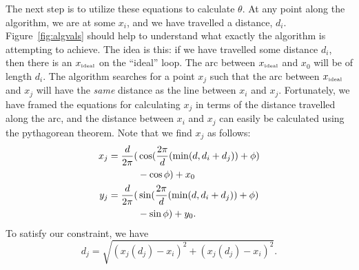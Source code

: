 \documentclass[twocolumn,11pt]{article}
\begin{document}
The next step is to utilize these equations to calculate $\theta$. At any point
along the algorithm, we are at some $x_i$, and we have travelled a distance,
$d_i$. Figure~\ref{fig:algvals} should help to understand what exactly the
algorithm is attempting to achieve. The idea is this: if we have travelled some
distance $d_i$, then there is an $x_{\mbox{{\tiny ideal}}}$ on the ``ideal''
loop. The arc between $x_{\mbox{{\tiny ideal}}}$ and $x_0$ will be of length
$d_i$. The algorithm searches for a point $x_j$ such that the arc between
$x_{\mbox{{\tiny ideal}}}$ and $x_j$ will have the \emph{same} distance as the
line between $x_i$ and $x_j$. Fortunately, we have framed the equations for
calculating $x_j$ in terms of the distance travelled along the arc, and the
distance between $x_i$ and $x_j$ can easily be calculated using the pythagorean
theorem. Note that we find $x_j$ as follows:
\begin{align}
  x_j = \frac{d}{2\pi} ( & \cos( \frac{ 2 \pi }{ d } ( \min( d, d_i + d_j ) )
                                  + \phi ) \notag \\ & - \cos \phi ) + x_0
                                  \label{eq:xj} \\
  y_j = \frac{d}{2\pi} ( & \sin( \frac{ 2 \pi }{ d } ( \min( d, d_i + d_j ) )
                                  + \phi ) \notag \\ & - \sin \phi ) + y_0.
                                  \label{eq:yj}
\end{align}
To satisfy our constraint, we have
\begin{equation}
d_j = \sqrt{ ( x_j(d_j) - x_i )^2 + ( x_j(d_j) - x_i )^2 }. \label{eq:dj}
\end{equation}
\end{document}
